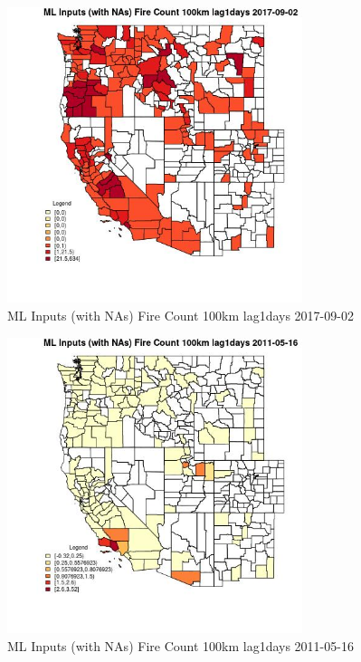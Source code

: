 \begin{figure} 
\centering  
\includegraphics[width=0.77\textwidth]{Code_Outputs/Report_ML_input_PM25_Step4_part_e_de_duplicated_aves_compiled_2019-05-20wNAs_CountyFire_Count_100km_lag1daysMean2017-09-02.jpg} 
\caption{\label{fig:Report_ML_input_PM25_Step4_part_e_de_duplicated_aves_compiled_2019-05-20wNAsCountyFire_Count_100km_lag1daysMean2017-09-02}ML Inputs (with NAs) Fire Count 100km lag1days 2017-09-02} 
\end{figure} 
 

\begin{figure} 
\centering  
\includegraphics[width=0.77\textwidth]{Code_Outputs/Report_ML_input_PM25_Step4_part_e_de_duplicated_aves_compiled_2019-05-20wNAs_CountyFire_Count_100km_lag1daysMean2011-05-16.jpg} 
\caption{\label{fig:Report_ML_input_PM25_Step4_part_e_de_duplicated_aves_compiled_2019-05-20wNAsCountyFire_Count_100km_lag1daysMean2011-05-16}ML Inputs (with NAs) Fire Count 100km lag1days 2011-05-16} 
\end{figure} 
 

